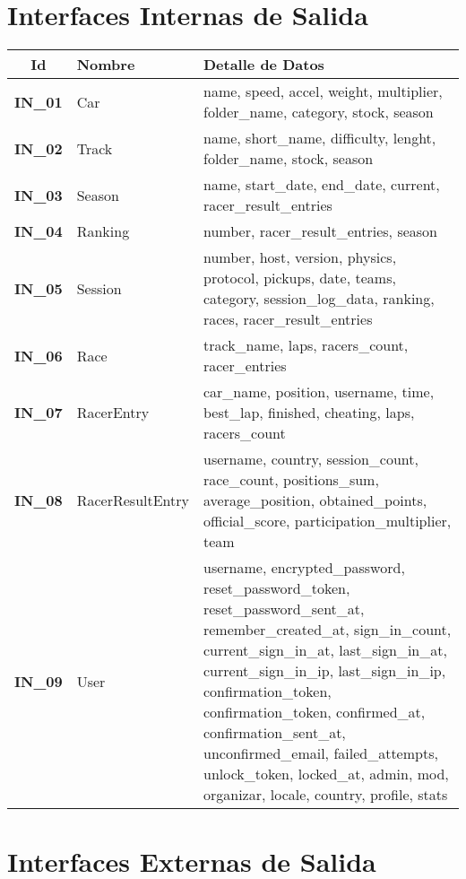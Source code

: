 \section{Interfaces Internas de Salida}

\begin{center}
	\begin{tabular}{ | c | p{3.5cm} | p{10cm} |}
		\hline
		\textbf{Id} & {\textbf{Nombre}} & {\textbf{Detalle de Datos}} \\ \hline
		{\textbf{IN\_01}} & Car & name, speed, accel, weight, multiplier, folder\_name, category, stock, season \\ \hline
		{\textbf{IN\_02}} & Track &  name, short\_name, difficulty, lenght, folder\_name, stock, season \\ \hline
		{\textbf{IN\_03}} & Season & name, start\_date, end\_date, current, racer\_result\_entries \\ \hline
		{\textbf{IN\_04}} & Ranking & number, racer\_result\_entries, season \\ \hline
		{\textbf{IN\_05}} & Session & number, host, version, physics, protocol, pickups, date, teams, category, session\_log\_data, ranking, races, racer\_result\_entries \\ \hline
		{\textbf{IN\_06}} & Race & track\_name, laps, racers\_count, racer\_entries \\ \hline
		{\textbf{IN\_07}} & RacerEntry & car\_name, position, username, time, best\_lap, finished, cheating, laps, racers\_count\\ \hline
		{\textbf{IN\_08}} & RacerResultEntry & username, country, session\_count, race\_count, positions\_sum, average\_position, obtained\_points, official\_score, participation\_multiplier, team \\ \hline
		{\textbf{IN\_09}} & User & username, encrypted\_password, reset\_password\_token, reset\_password\_sent\_at, remember\_created\_at, sign\_in\_count, current\_sign\_in\_at, last\_sign\_in\_at, current\_sign\_in\_ip, last\_sign\_in\_ip, confirmation\_token, confirmation\_token, confirmed\_at, confirmation\_sent\_at, unconfirmed\_email, failed\_attempts, unlock\_token, locked\_at, admin, mod, organizar, locale, country, profile, stats \\ \hline
	\end{tabular}
\end{center}

\newpage

\section{Interfaces Externas de Salida}

